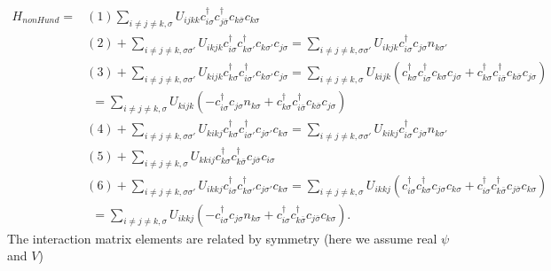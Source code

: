 \documentclass[12pt,a4paper]{scrartcl}
\numberwithin{equation}{section}
\begin{document}
\begin{align}
  H_{nonHund} 
 = & (1) \sum_{i\neq j\neq k,\sigma} U_{ijkk} c^{\dagger}_{i\sigma} c^{\dagger}_{j\bar{\sigma}} c_{k\bar{\sigma}} c_{k\sigma} \\
% 
 & (2) + \sum_{i\neq j\neq k,\sigma\sigma'} U_{ikjk} c^{\dagger}_{i\sigma} c^{\dagger}_{k\sigma'} c_{k\sigma'} c_{j\sigma} 
       = \sum_{i\neq j\neq k,\sigma\sigma'} U_{ikjk} c^{\dagger}_{i\sigma} c_{j\sigma}  n_{k\sigma'}\\
% 
 & (3) + \sum_{i\neq j\neq k,\sigma\sigma'} U_{kijk} c^{\dagger}_{k\sigma} c^{\dagger}_{i\sigma'} c_{k\sigma'} c_{j\sigma} 
       = \sum_{i\neq j\neq k,\sigma} U_{kijk} (
                       c^{\dagger}_{k\sigma} c^{\dagger}_{i\sigma} c_{k\sigma} c_{j\sigma}
                      +c^{\dagger}_{k\sigma} c^{\dagger}_{i\bar{\sigma}} c_{k\bar{\sigma}} c_{j\sigma}
                      ) \nonumber \\
    &\ \  = \sum_{i\neq j\neq k,\sigma} U_{kijk} ( - c^{\dagger}_{i\sigma} c_{j\sigma} n_{k\sigma}
                            +c^{\dagger}_{k\sigma} c^{\dagger}_{i\bar{\sigma}} c_{k\bar{\sigma}} c_{j\sigma} ) \\
% 
 & (4) + \sum_{i\neq j\neq k,\sigma\sigma'} U_{kikj} c^{\dagger}_{k\sigma} c^{\dagger}_{i\sigma'} c_{j\sigma'} c_{k\sigma} 
       = \sum_{i\neq j\neq k,\sigma\sigma'} U_{kikj} c^{\dagger}_{i\sigma} c_{j\sigma}  n_{k\sigma'}\\
%
 & (5) + \sum_{i\neq j\neq k,\sigma} U_{kkij} c^{\dagger}_{k\sigma} c^{\dagger}_{k\bar{\sigma}} c_{j\bar{\sigma}} c_{i\sigma}  \\
% 
 & (6) + \sum_{i\neq j\neq k,\sigma\sigma'} U_{ikkj} c^{\dagger}_{i\sigma} c^{\dagger}_{k\sigma'} c_{j\sigma'} c_{k\sigma} 
       = \sum_{i\neq j\neq k,\sigma} U_{ikkj} (
                       c^{\dagger}_{i\sigma} c^{\dagger}_{k\sigma} c_{j\sigma} c_{k\sigma}
                      +c^{\dagger}_{i\sigma} c^{\dagger}_{k\bar{\sigma}} c_{j\bar{\sigma}} c_{k\sigma}
                      ) \nonumber  \\
    &\ \  = \sum_{i\neq j\neq k,\sigma} U_{ikkj} ( - c^{\dagger}_{i\sigma} c_{j\sigma} n_{k\sigma}
                            +c^{\dagger}_{i\sigma} c^{\dagger}_{k\bar{\sigma}} c_{j\bar{\sigma}} c_{k\sigma} ) .
\end{align}
The interaction matrix elements are related by symmetry (here we assume real $\psi$ and $V$)
\end{document}
